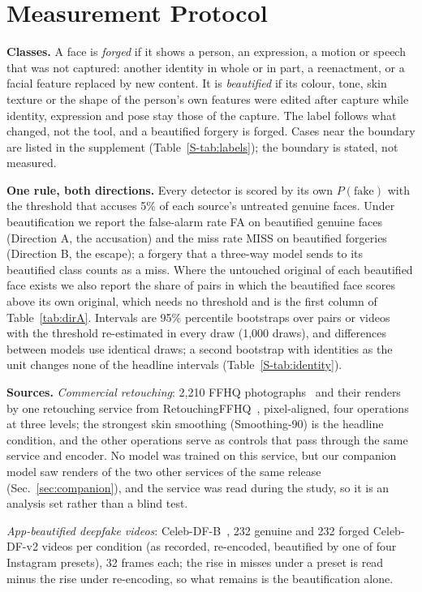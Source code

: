 \documentclass[conference]{IEEEtran}
\begin{document}
\section{Measurement Protocol}
\label{sec:protocol}
\textbf{Classes.} A face is \emph{forged} if it shows a person, an expression, a motion or speech that was not captured:
another identity in whole or in part, a reenactment, or a facial feature replaced by new content. It is \emph{beautified} if
its colour, tone, skin texture or the shape of the person's own features were edited after capture while identity,
expression and pose stay those of the capture. The label follows what changed, not the tool, and a beautified forgery is
forged. Cases near the boundary are listed in the supplement (Table~\ref{S-tab:labels}); the boundary is stated, not
measured.

\textbf{One rule, both directions.} Every detector is scored by its own $P(\text{fake})$ with the threshold that accuses
5\% of each source's untreated genuine faces. Under beautification we report the false-alarm rate FA on beautified genuine
faces (Direction A, the accusation) and the miss rate MISS on beautified forgeries (Direction B, the escape); a forgery that a
three-way model sends to its beautified class counts as a miss. Where the untouched original of each beautified face exists
we also report the share of pairs in which the beautified face scores above its own original, which needs no threshold and
is the first column of Table~\ref{tab:dirA}. Intervals are 95\% percentile bootstraps over pairs or videos with the threshold
re-estimated in every draw (1,000 draws), and differences between models use identical draws; a second bootstrap with
identities as the unit changes none of the headline intervals (Table~\ref{S-tab:identity}).

\textbf{Sources.} \emph{Commercial retouching}: 2,210 FFHQ photographs~\cite{ffhq} and their renders by one retouching
service from RetouchingFFHQ~\cite{retouchingffhq}, pixel-aligned, four operations at three levels; the strongest skin
smoothing (Smoothing-90) is the headline condition, and the other operations serve as controls that pass through the same
service and encoder. No model was trained on this service, but our companion model saw renders of the two other services of the same release (Sec.~\ref{sec:companion}), and the service was read during the study, so it is an analysis set rather than a blind test.

\emph{App-beautified deepfake videos}: Celeb-DF-B~\cite{libourel2024}, 232 genuine and 232 forged
Celeb-DF-v2 videos per condition (as recorded, re-encoded, beautified by one of four Instagram presets), 32 frames each; the
rise in misses under a preset is read minus the rise under re-encoding, so what remains is the beautification alone.
\end{document}
